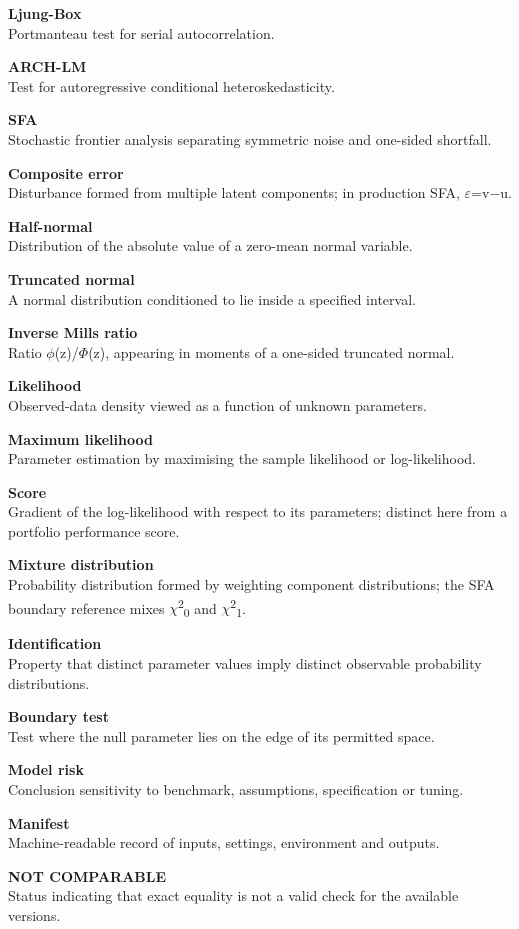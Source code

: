\textbf{Ljung-Box}\\
Portmanteau test for serial autocorrelation.

\textbf{ARCH-LM}\\
Test for autoregressive conditional heteroskedasticity.

\textbf{SFA}\\
Stochastic frontier analysis separating symmetric noise and one-sided
shortfall.

\textbf{Composite error}\\
Disturbance formed from multiple latent components; in production SFA,
\ensuremath{\varepsilon }=v\ensuremath{-}u.

\textbf{Half-normal}\\
Distribution of the absolute value of a zero-mean normal variable.

\textbf{Truncated normal}\\
A normal distribution conditioned to lie inside a specified interval.

\textbf{Inverse Mills ratio}\\
Ratio \ensuremath{\phi }(z)/\ensuremath{\Phi }(z), appearing in moments of a one-sided truncated normal.

\textbf{Likelihood}\\
Observed-data density viewed as a function of unknown parameters.

\textbf{Maximum likelihood}\\
Parameter estimation by maximising the sample likelihood or
log-likelihood.

\textbf{Score}\\
Gradient of the log-likelihood with respect to its parameters; distinct
here from a portfolio performance score.

\textbf{Mixture distribution}\\
Probability distribution formed by weighting component distributions;
the SFA boundary reference mixes \ensuremath{\chi }\textsuperscript{2}\textsubscript{0} and
\ensuremath{\chi }\textsuperscript{2}\textsubscript{1}.

\textbf{Identification}\\
Property that distinct parameter values imply distinct observable
probability distributions.

\textbf{Boundary test}\\
Test where the null parameter lies on the edge of its permitted space.

\textbf{Model risk}\\
Conclusion sensitivity to benchmark, assumptions, specification or
tuning.

\textbf{Manifest}\\
Machine-readable record of inputs, settings, environment and outputs.

\textbf{NOT COMPARABLE}\\
Status indicating that exact equality is not a valid check for the
available versions.

